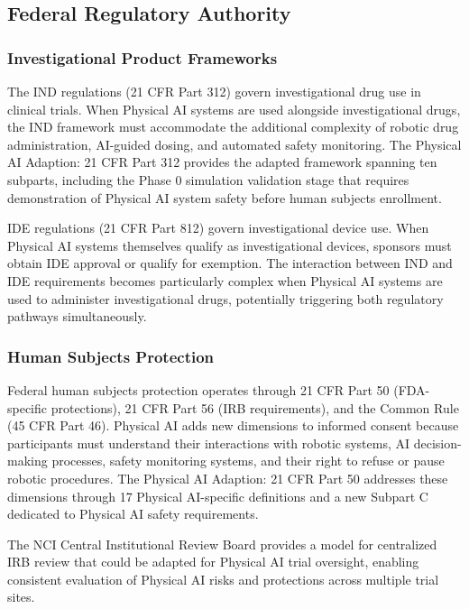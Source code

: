 \subsection{Federal Regulatory Authority}
\label{subsec:federal-authority}

\subsubsection{Investigational Product Frameworks}

The IND regulations (21 CFR Part 312) \cite{cfr-part-312} govern investigational
drug use in clinical trials. When Physical AI systems are used alongside
investigational drugs, the IND framework must accommodate the additional
complexity of robotic drug administration, AI-guided dosing, and automated
safety monitoring. The Physical AI Adaption: 21 CFR Part 312 \cite{cfr312-adapt}
provides the adapted framework spanning ten subparts, including the Phase 0
simulation validation stage that requires demonstration of Physical AI
system safety before human subjects enrollment.

IDE regulations (21 CFR Part 812) govern investigational device use. When
Physical AI systems themselves qualify as investigational devices, sponsors must
obtain IDE approval or qualify for exemption. The interaction between IND and
IDE requirements becomes particularly complex when Physical AI systems are used
to administer investigational drugs, potentially triggering both regulatory
pathways simultaneously.

\subsubsection{Human Subjects Protection}

Federal human subjects protection operates through 21 CFR Part 50 \cite{cfr-part-50}
(FDA-specific protections), 21 CFR Part 56 (IRB requirements), and the Common
Rule (45 CFR Part 46). Physical AI adds new dimensions to informed consent
because participants must understand their interactions with robotic systems, AI
decision-making processes, safety monitoring systems, and their right to refuse
or pause robotic procedures. The Physical AI Adaption: 21 CFR Part 50
\cite{cfr50-adapt} addresses these dimensions through 17 Physical AI-specific
definitions and a new Subpart C dedicated to Physical AI safety requirements.

The NCI Central Institutional Review Board \cite{nci-cirb} provides a model for
centralized IRB review that could be adapted for Physical AI trial oversight,
enabling consistent evaluation of Physical AI risks and protections across
multiple trial sites.

